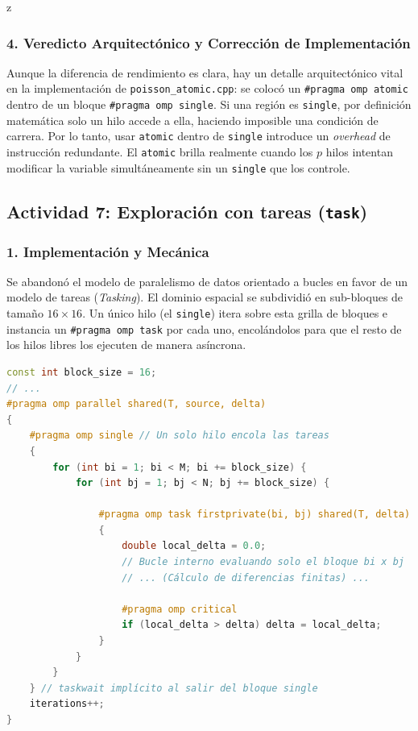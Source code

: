 z\documentclass[11pt,a4paper]{article}
\begin{document}
\subsubsection*{4. Veredicto Arquitectónico y Corrección de Implementación}
Aunque la diferencia de rendimiento es clara, hay un detalle arquitectónico vital en la implementación de \texttt{poisson\_atomic.cpp}: se colocó un \texttt{\#pragma omp atomic} dentro de un bloque \texttt{\#pragma omp single}. Si una región es \texttt{single}, por definición matemática solo un hilo accede a ella, haciendo imposible una condición de carrera. Por lo tanto, usar \texttt{atomic} dentro de \texttt{single} introduce un \textit{overhead} de instrucción redundante. El \texttt{atomic} brilla realmente cuando los $p$ hilos intentan modificar la variable simultáneamente sin un \texttt{single} que los controle.


\subsection*{Actividad 7: Exploración con tareas (\texttt{task})}

\subsubsection*{1. Implementación y Mecánica}
Se abandonó el modelo de paralelismo de datos orientado a bucles en favor de un modelo de tareas (\textit{Tasking}). El dominio espacial se subdividió en sub-bloques de tamaño $16 \times 16$. Un único hilo (el \texttt{single}) itera sobre esta grilla de bloques e instancia un \texttt{\#pragma omp task} por cada uno, encolándolos para que el resto de los hilos libres los ejecuten de manera asíncrona.

\begin{lstlisting}[language=C++, caption={Implementación de tareas asíncronas por bloques de memoria.}, label={lst:act7}]
const int block_size = 16; 
// ...
#pragma omp parallel shared(T, source, delta)
{
    #pragma omp single // Un solo hilo encola las tareas
    {
        for (int bi = 1; bi < M; bi += block_size) {
            for (int bj = 1; bj < N; bj += block_size) {
                
                #pragma omp task firstprivate(bi, bj) shared(T, delta)
                {
                    double local_delta = 0.0;
                    // Bucle interno evaluando solo el bloque bi x bj
                    // ... (Cálculo de diferencias finitas) ...
                    
                    #pragma omp critical
                    if (local_delta > delta) delta = local_delta;
                }
            }
        }
    } // taskwait implícito al salir del bloque single
    iterations++; 
}
\end{lstlisting}
\end{document}
